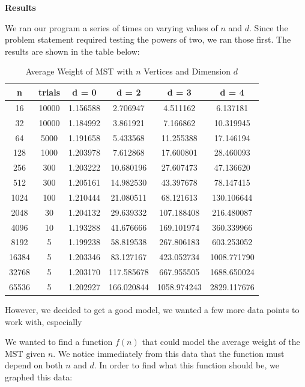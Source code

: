 \documentclass[12pt]{article}
\begin{document}
\bigskip

\pagebreak

\textbf{Results}

We ran our program a series of times on varying values of $n$ and $d$. Since the problem statement required testing the powers of two, we ran those first. The results are shown in the table below: \\

\begin{table}[h!]
\centering
\caption{Average Weight of MST with $n$ Vertices and Dimension $d$}
\begin{tabular} {c | c | c | c | c | c  }
n&trials&d = 0&d = 2&d = 3&d = 4\\ \hline
16&10000&1.156588&2.706947&4.511162&6.137181\\
32&10000&1.184992&3.861921&7.166862&10.319945\\
64&5000&1.191658&5.433568&11.255388&17.146194\\
128&1000&1.203978&7.612868&17.600801&28.460093\\
256&300&1.203222&10.680196&27.607473&47.136620\\
512&300&1.205161&14.982530&43.397678&78.147415\\
1024&100&1.210444&21.080511&68.121613&130.106644\\
2048&30&1.204132&29.639332&107.188408&216.480087\\
4096&10&1.193288&41.676666&169.101974&360.339966\\
8192&5&1.199238&58.819538&267.806183&603.253052\\
16384&5&1.203346&83.127167&423.052734&1008.771790\\
32768&5&1.203170&117.585678&667.955505&1688.650024\\
65536&5&1.202927&166.020844&1058.974243&2829.117676\\
\end{tabular}
\label{table:1}
\end{table}

However, we decided to get a good model, we wanted a few more data points to work with, especially

We wanted to find a function $f(n)$ that could model the average weight of the MST given $n$. We notice immediately from this data that the function must depend on both $n$ and $d$. In order to find what this function should be, we graphed this data:
\end{document}
